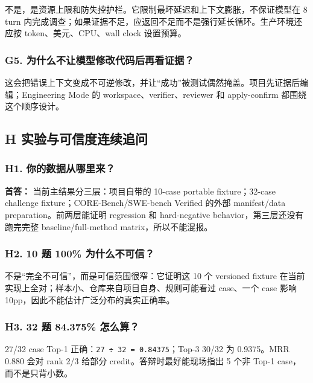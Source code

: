 \documentclass[UTF8,12pt,openany]{ctexbook}
\begin{document}
不是，是资源上限和防失控护栏。它限制最坏延迟和上下文膨胀，不保证模型在 8 turn 内完成调查；如果证据不足，应返回不足而不是强行延长循环。生产环境还应按 token、美元、CPU、wall clock 设置预算。\par

\subsubsection{G5. 为什么不让模型修改代码后再看证据？}

这会把错误上下文变成不可逆修改，并让“成功”被测试偶然掩盖。项目先证据后编辑；Engineering Mode 的 workspace、verifier、reviewer 和 apply-confirm 都围绕这个顺序设计。\par

\subsection{H 实验与可信度连续追问}

\subsubsection{H1. 你的数据从哪里来？}

\textbf{首答：} 当前主结果分三层：项目自带的 10-case portable fixture；32-case challenge fixture；CORE-Bench/SWE-bench Verified 的外部 manifest/data preparation。前两层能证明 regression 和 hard-negative behavior，第三层还没有跑完完整 baseline/full-method matrix，所以不能混报。\par

\subsubsection{H2. 10 题 100\% 为什么不可信？}

不是“完全不可信”，而是可信范围很窄：它证明这 10 个 versioned fixture 在当前实现上全对；样本小、仓库来自项目自身、规则可能看过 case、一个 case 影响 10pp，因此不能估计广泛分布的真实正确率。\par

\subsubsection{H3. 32 题 84.375\% 怎么算？}

27/32 case Top-1 正确：\texttt{27 ÷ 32 = 0.84375}；Top-3 30/32 为 0.9375。MRR 0.880 会对 rank 2/3 给部分 credit。答辩时最好能现场指出 5 个非 Top-1 case，而不是只背小数。\par
\end{document}
